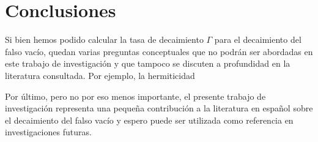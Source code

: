 \chapter{Conclusiones}

Si bien hemos podido calcular la tasa de decaimiento $\Gamma$ para el decaimiento del falso vacío, quedan varias preguntas conceptuales que no podrán ser abordadas en este trabajo de investigación y que tampoco se discuten a profundidad en la literatura consultada. Por ejemplo, la hermiticidad 

Por último, pero no por eso menos importante, el presente trabajo de investigación representa una pequeña contribución a la literatura en español sobre el decaimiento del falso vacío y espero puede ser utilizada como referencia en investigaciones futuras. 